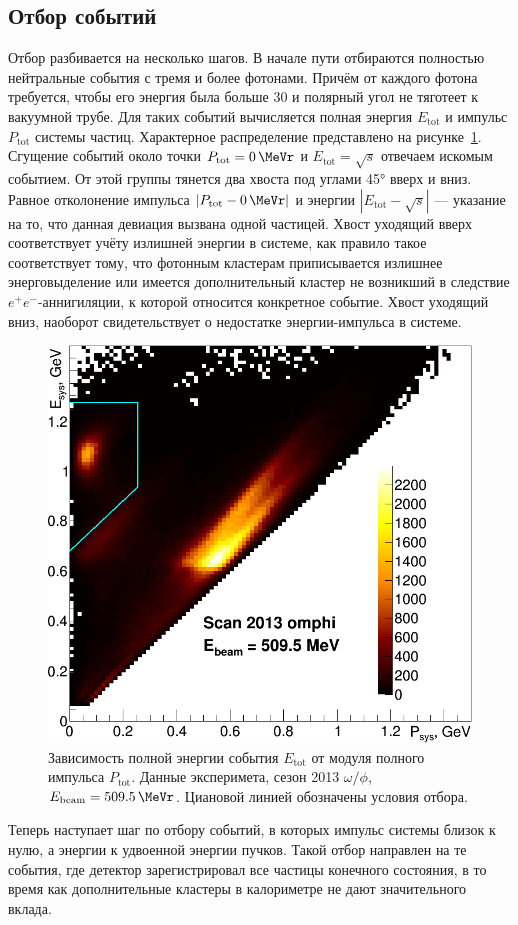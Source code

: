 \subsection{Отбор событий}

Отбор разбивается на несколько шагов. В начале пути отбираются полностью нейтральные события с тремя и более фотонами.
Причём от каждого фотона требуется, чтобы его энергия была больше \SI{30}{\MeVr} и полярный угол не тяготеет к вакуумной трубе.
Для таких событий вычисляется полная энергия $E_{\text{tot}}$ и импульс $P_{\text{tot}}$ системы частиц.
Характерное распределение представлено на рисунке~\ref{fig:EtvsPt5095}.
Сгущение событий около точки $P_{\text{tot}} = \SI{0}{\MeVr}$ и $E_{\text{tot}} = \sqrt{s}$ отвечаем искомым событием.
От этой группы тянется два хвоста под углами \ang{45} вверх и вниз.
Равное отколонение импульса $|P_{\text{tot}} - \SI{0}{\MeVr}|$ и энергии $|E_{\text{tot}} - \sqrt{s}|$
---
указание на то,
что данная девиация вызвана одной частицей.
Хвост уходящий вверх соответствует учёту излишней энергии в системе,
как правило такое соответствует тому,
что фотонным кластерам приписывается излишнее энерговыделение или имеется дополнительный кластер не возникший в следствие $e^+e^-$-аннигиляции,
к которой относится конкретное событие.
Хвост уходящий вниз, наоборот свидетельствует о недостатке энергии-импульса в системе.

\begin{figure}
	\centering
	\label{fig:EtvsPt5095}
	\includegraphics[width=.5\textwidth]{img/EtvsPt5095.png}
	\caption{Зависимость полной энергии события $E_{\text{tot}}$ от модуля полного импульса $P_{\text{tot}}$.
		Данные эксперимета, сезон 2013 $\omega / \phi$, $E_{\text{beam}} = \SI{509.5}{\MeVr}$.
		Циановой линией обозначены условия отбора.}\label{fig:EtvsPt5095}
\end{figure}

Теперь наступает шаг по отбору событий, в которых импульс системы близок к нулю,
а энергии к удвоенной энергии пучков.
Такой отбор направлен на те события,
где детектор зарегистрировал все частицы конечного состояния,
в то время как дополнительные кластеры в калориметре не дают значительного вклада.

